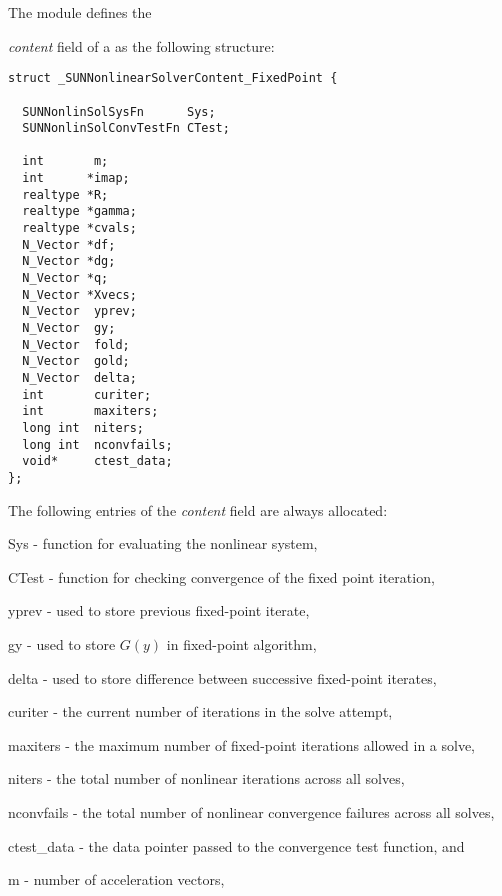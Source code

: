 The {\sunnonlinsolfixedpoint} module defines the {\textit{content} field of a
 as the following structure:
\begin{verbatim}
struct _SUNNonlinearSolverContent_FixedPoint {

  SUNNonlinSolSysFn      Sys;
  SUNNonlinSolConvTestFn CTest;

  int       m;
  int      *imap;
  realtype *R;
  realtype *gamma;
  realtype *cvals;
  N_Vector *df;
  N_Vector *dg;
  N_Vector *q;
  N_Vector *Xvecs;
  N_Vector  yprev;
  N_Vector  gy;
  N_Vector  fold;
  N_Vector  gold;
  N_Vector  delta;
  int       curiter;
  int       maxiters;
  long int  niters;
  long int  nconvfails;
  void*     ctest_data;
};
\end{verbatim}
The following entries of the \emph{content} field are always
allocated:
\begin{args}[nconvfails]
  \item[Sys]         - function for evaluating the nonlinear system,
  \item[CTest]       - function for checking convergence of the fixed point iteration,
  \item[yprev]       -  used to store previous fixed-point iterate,
  \item[gy]          -  used to store $G(y)$ in fixed-point algorithm,
  \item[delta]       -  used to store difference between successive fixed-point iterates,
  \item[curiter]     - the current number of iterations in the solve attempt,
  \item[maxiters]    - the maximum number of fixed-point iterations allowed in
                       a solve,
  \item[niters]      - the total number of nonlinear iterations across all
                       solves,
  \item[nconvfails]  - the total number of nonlinear convergence failures across
                       all solves,
  \item[ctest\_data] - the data pointer passed to the convergence test function, and
  \item[m]           - number of acceleration vectors,
\end{args}
\vspace{1em}

}
